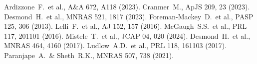 \documentclass[twocolumn]{aastex631}
\begin{document}
\begin{thebibliography}{}
 Ardizzone~F.\ et al., A\&A 672, A118 (2023).
 Cranmer~M., ApJS 209, 23 (2023).
 Desmond~H.\ et al., MNRAS 521, 1817 (2023).
 Foreman-Mackey~D.\ et al., PASP 125, 306 (2013).
 Lelli~F.\ et al., AJ 152, 157 (2016).
 McGaugh~S.S.\ et al., PRL 117, 201101 (2016).
 Mistele~T.\ et al., JCAP 04, 020 (2024).
 Desmond~H.\ et al., MNRAS 464, 4160 (2017).
 Ludlow~A.D.\ et al., PRL 118, 161103 (2017).
 Paranjape~A.\ \& Sheth~R.K., MNRAS 507, 738 (2021).
\end{thebibliography}
\end{document}
